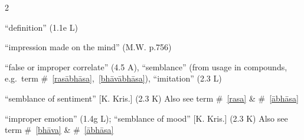 \documentclass[10pt]{article}
\begin{document}
\begin{multicols}{2}
\begin{enumerate}[
			leftmargin=0em,
			rightmargin=0em,
		]
		 ``definition'' (1.1e L)

		``impression made on the mind'' (M.W. p.756)

		 ``false or improper correlate'' (4.5 A),
		``semblance'' (from usage in compounds, e.g.\ term \#~\ref{rasābhāsa},~\ref{bhāvābhāsa}),
		``imitation'' (2.3 L)

		 ``semblance of sentiment'' [K. Kris.] (2.3 K)
		Also see term \#~\ref{rasa} \& \#~\ref{ābhāsa}

		 ``improper emotion'' (1.4g L);
		``semblance of mood'' [K. Kris.] (2.3 K)
		Also see term \#~\ref{bhāva} \& \#~\ref{ābhāsa}


\end{enumerate}
\end{multicols}
\end{document}
